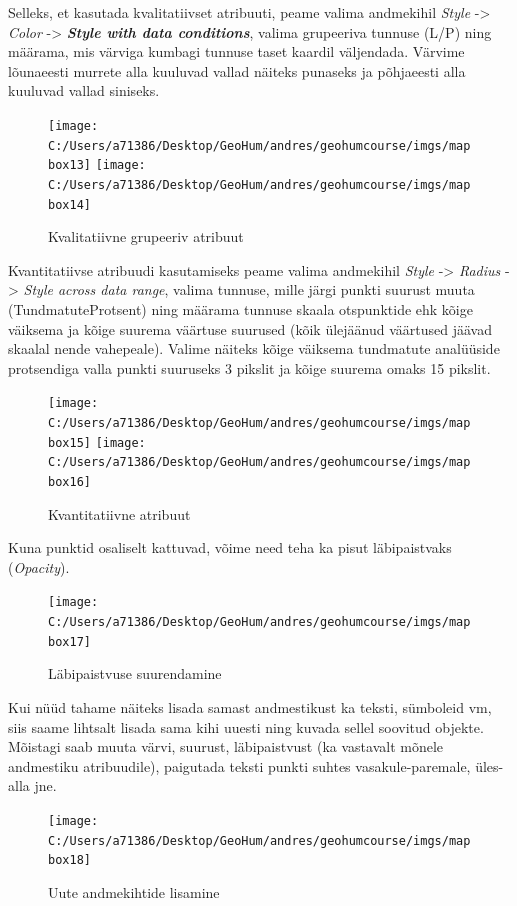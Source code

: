 \documentclass[
]{book}
\begin{document}
Selleks, et kasutada kvalitatiivset atribuuti, peame valima andmekihil \emph{Style} -\textgreater{} \emph{Color} -\textgreater{} \textbf{\emph{Style with data conditions}}, valima grupeeriva tunnuse (L/P) ning määrama, mis värviga kumbagi tunnuse taset kaardil väljendada. Värvime lõunaeesti murrete alla kuuluvad vallad näiteks punaseks ja põhjaeesti alla kuuluvad vallad siniseks.

\begin{figure}
\texttt{[image: C:/Users/a71386/Desktop/GeoHum/andres/geohumcourse/imgs/mapbox13]} \texttt{[image: C:/Users/a71386/Desktop/GeoHum/andres/geohumcourse/imgs/mapbox14]} \caption{Kvalitatiivne grupeeriv atribuut}\label{fig:mapbox8}
\end{figure}

Kvantitatiivse atribuudi kasutamiseks peame valima andmekihil \emph{Style} -\textgreater{} \emph{Radius} -\textgreater{} \emph{Style across data range}, valima tunnuse, mille järgi punkti suurust muuta (TundmatuteProtsent) ning määrama tunnuse skaala otspunktide ehk kõige väiksema ja kõige suurema väärtuse suurused (kõik ülejäänud väärtused jäävad skaalal nende vahepeale). Valime näiteks kõige väiksema tundmatute analüüside protsendiga valla punkti suuruseks 3 pikslit ja kõige suurema omaks 15 pikslit.

\begin{figure}
\texttt{[image: C:/Users/a71386/Desktop/GeoHum/andres/geohumcourse/imgs/mapbox15]} \texttt{[image: C:/Users/a71386/Desktop/GeoHum/andres/geohumcourse/imgs/mapbox16]} \caption{Kvantitatiivne atribuut}\label{fig:mapbox9}
\end{figure}

Kuna punktid osaliselt kattuvad, võime need teha ka pisut läbipaistvaks (\emph{Opacity}).

\begin{figure}
\texttt{[image: C:/Users/a71386/Desktop/GeoHum/andres/geohumcourse/imgs/mapbox17]} \caption{Läbipaistvuse suurendamine}\label{fig:mapbox10}
\end{figure}

Kui nüüd tahame näiteks lisada samast andmestikust ka teksti, sümboleid vm, siis saame lihtsalt lisada sama kihi uuesti ning kuvada sellel soovitud objekte. Mõistagi saab muuta värvi, suurust, läbipaistvust (ka vastavalt mõnele andmestiku atribuudile), paigutada teksti punkti suhtes vasakule-paremale, üles-alla jne.

\begin{figure}
\texttt{[image: C:/Users/a71386/Desktop/GeoHum/andres/geohumcourse/imgs/mapbox18]} \caption{Uute andmekihtide lisamine}\label{fig:mapbox11}
\end{figure}
\end{document}
